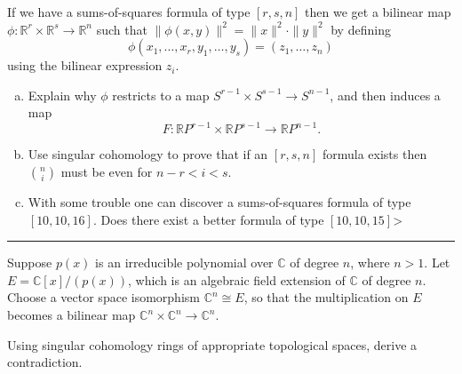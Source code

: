 \documentclass[letterpaper, 12pt]{article}
\begin{document}
\begin{problem}{5}
If we have a sums-of-squares formula of type \([r,s,n]\) then we get a bilinear map \(\phi:\mathbb{R}^r\times \mathbb{R}^s\rightarrow \mathbb{R}^n\) such that \(\| \phi(x,y)\|^2=\|x\|^2\cdot \|y\|^2\) by defining 
\[\phi(x_1,\ldots,x_r,y_1,\ldots,y_s)=(z_1,\ldots,z_n)\]
using the bilinear expression \(z_i\).
\begin{enumerate}[(a)]
\item Explain why \(\phi\) restricts to a map \(S^{r-1}\times S^{s-1}\rightarrow S^{n-1}\), and then induces a map 
\[F:\mathbb{R}P^{r-1}\times \mathbb{R}P^{s-1}\rightarrow \mathbb{R}P^{n-1}.\]
\item Use singular cohomology to prove that if an \([r,s,n]\) formula exists then \(n \choose i\) must be even for \(n-r<i<s\). 
\item With some trouble one can discover a sums-of-squares formula of type \([10,10,16]\). Does there exist a better formula of type \([10,10,15]\)>
\end{enumerate}
\end{problem}
\begin{solution}

\end{solution}

\noindent\rule{7in}{2.8pt}
\begin{problem}{6}
Suppose \(p(x)\) is an irreducible polynomial over \(\mathbb{C}\) of degree \(n\), where \(n>1\). Let \(E=\mathbb{C}[x]/(p(x))\), which is an algebraic field extension of \(\mathbb{C}\) of degree \(n\). Choose a vector space isomorphism \(\mathbb{C}^n\cong E\), so that the multiplication on \(E\) becomes a bilinear map \(\mathbb{C}^n\times \mathbb{C}^n\rightarrow \mathbb{C}^n\).

Using singular cohomology rings of appropriate topological spaces, derive a contradiction. 
\end{problem}
\begin{solution}

\end{solution}
\end{document}
